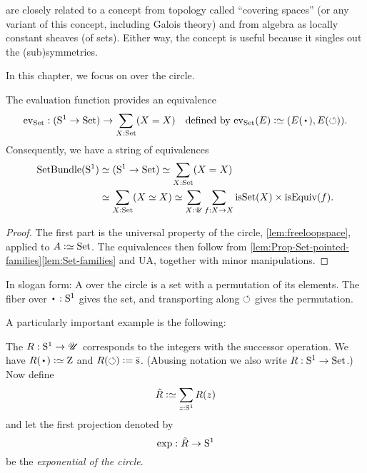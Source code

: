 \begin{remark}
  \Coverings are closely related to a concept from topology called ``covering spaces''
(or any variant of this concept, including Galois theory) and from algebra as locally constant sheaves (of sets).
Either way, the concept is useful because it singles out the (sub)symmetries.
\end{remark}

In this chapter, we focus on \coverings over the circle.

\begin{theorem}\label{thm:coveringsofS1perms}
  The evaluation function provides an equivalence
  \[
    \ev_\Set : (\Sc \to \Set) \to \sum_{X:\Set}(X=X)
    \quad\text{defined by $\ev_\Set(E) \defeq (E(\base),E(\Sloop))$.}
  \]
  Consequently, we have a string of equivalences
  \begin{align*}
    \SetBundle(\Sc)
    &\equiv (\Sc \to \Set)
      \equiv \sum_{X:\Set}(X=X) \\
    &\equiv \sum_{X:\Set}(X\equiv X)
    \equiv \sum_{X:\UU}\sum_{f:X\to X}
    \isset(X) \times \isEq(f).
  \end{align*}
\end{theorem}
\begin{proof}
  The first part is the universal property of the circle,
  \cref{lem:freeloopspace}, applied to $A\defeq\Set$.
  The equivalences then follow from \cref{lem:Prop-Set-pointed-families}\ref{lem:Set-families} and UA,
  together with minor manipulations.
\end{proof}
In slogan form: A \covering over the circle is a set with a permutation of its elements.
The fiber over $\base:\Sc$ gives the set,
and transporting along $\circlearrowleft$ gives the permutation.

A particularly important example is the following:
\begin{definition}\label{def:RtoS1}
  The \covering $R:{\mathrm{S}^1}\to{\mathscr{U}}$ corresponds to the integers with the successor operation.
  We have $R(\base)\defeq\zet$ and $R(\Sloop)\defis \etop{\zs}$.
  (Abusing notation we also write $R:{\mathrm{S}^1}\to\mathrm{Set}$.)
  Now define
  \[
    \tilde R\defeq\sum_{z:\Sc}R(z)
  \]
  and let the first projection denoted by
  \[
    \exp:\tilde R \to {\mathrm{S}^1}
  \]
  be the \emph{exponential \covering of the circle}.
\end{definition}

